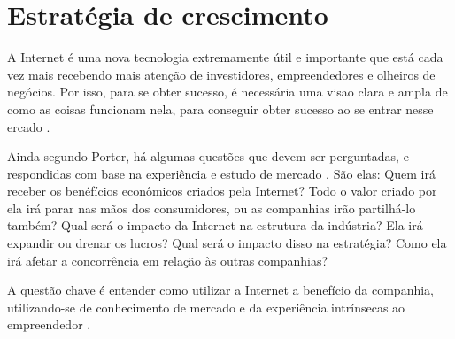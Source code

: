  \chapter{Estratégia de crescimento} 
A Internet é uma nova tecnologia extremamente útil e importante que está cada 
vez mais recebendo mais atenção de investidores, empreendedores e olheiros de 
negócios. Por isso, para se obter sucesso, é necessária uma visao clara e 
ampla de como as coisas funcionam nela, para conseguir obter sucesso ao se 
entrar nesse ercado \cite{porter2008competition}. 

Ainda segundo Porter, há algumas questões que devem ser perguntadas, e 
respondidas com base na experiência e estudo de mercado
\cite{porter2003competitive}. São elas: Quem irá 
receber os benéfícios econômicos criados pela Internet? Todo o valor criado 
por ela irá parar nas mãos dos consumidores, ou as companhias irão partilhá-lo 
também? Qual será o impacto da Internet na estrutura da indústria? Ela irá 
expandir ou drenar os lucros? Qual será o impacto disso na estratégia? Como 
ela irá afetar a concorrência em relação às outras companhias?

A questão chave é entender como utilizar a Internet a benefício da companhia, 
utilizando-se de conhecimento de mercado e da experiência intrínsecas ao 
empreendedor \cite{weston2000fundamentos}.

